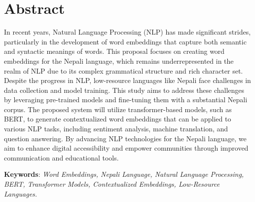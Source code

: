 		
		
		\large
			\chapter*{Abstract}
		\normalsize
        \noindent
		In recent years, Natural Language Processing (NLP) has made significant strides, particularly in the development of word embeddings that capture both semantic and syntactic meanings of words. This proposal focuses on creating word embeddings for the Nepali language, which remains underrepresented in the realm of NLP due to its complex grammatical structure and rich character set. Despite the progress in NLP, low-resource languages like Nepali face challenges in data collection and model training. This study aims to address these challenges by leveraging pre-trained models and fine-tuning them with a substantial Nepali corpus. The proposed system will utilize transformer-based models, such as BERT, to generate contextualized word embeddings that can be applied to various NLP tasks, including sentiment analysis, machine translation, and question answering. By advancing NLP technologies for the Nepali language, we aim to enhance digital accessibility and empower communities through improved communication and educational tools.

		\noindent
		\textbf{Keywords}: 
		\textit{Word Embeddings, Nepali Language, Natural Language Processing, BERT, Transformer Models, Contextualized Embeddings, Low-Resource Languages.\\
 }\\

		\break


	    \tableofcontents

		\listoftables
		\break
		\pagebreak

		\listoffigures
		\break
	
	
	
		\Large
			\begingroup
				\let\clearpage\relax
